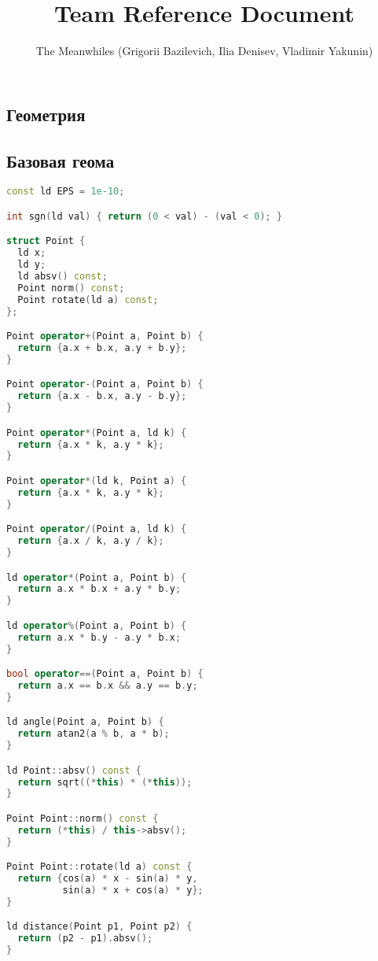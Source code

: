 \documentclass[10pt,a4paper,landscape,twosided]{extarticle}
\begin{document}
\title{Team Reference Document}
\author{The Meanwhiles (Grigorii Bazilevich, Ilia Denisev, Vladimir Yakunin)}
\maketitle
\begin{multicols}{3}

\tableofcontents
{}


\section{Геометрия}

\subsection{Базовая геома}
\begin{lstlisting}[language=C++]
const ld EPS = 1e-10;

int sgn(ld val) { return (0 < val) - (val < 0); }

struct Point {
  ld x;
  ld y;
  ld absv() const;
  Point norm() const;
  Point rotate(ld a) const;
};

Point operator+(Point a, Point b) {
  return {a.x + b.x, a.y + b.y};
}

Point operator-(Point a, Point b) {
  return {a.x - b.x, a.y - b.y};
}

Point operator*(Point a, ld k) {
  return {a.x * k, a.y * k};
}

Point operator*(ld k, Point a) {
  return {a.x * k, a.y * k};
}

Point operator/(Point a, ld k) {
  return {a.x / k, a.y / k};
}

ld operator*(Point a, Point b) {
  return a.x * b.x + a.y * b.y;
}

ld operator%(Point a, Point b) {
  return a.x * b.y - a.y * b.x;
}

bool operator==(Point a, Point b) {
  return a.x == b.x && a.y == b.y;
}

ld angle(Point a, Point b) {
  return atan2(a % b, a * b);
}

ld Point::absv() const {
  return sqrt((*this) * (*this));
}

Point Point::norm() const {
  return (*this) / this->absv();
}

Point Point::rotate(ld a) const {
  return {cos(a) * x - sin(a) * y,
          sin(a) * x + cos(a) * y};
}

ld distance(Point p1, Point p2) {
  return (p2 - p1).absv();
}


\end{lstlisting}
\end{multicols}
\end{document}
